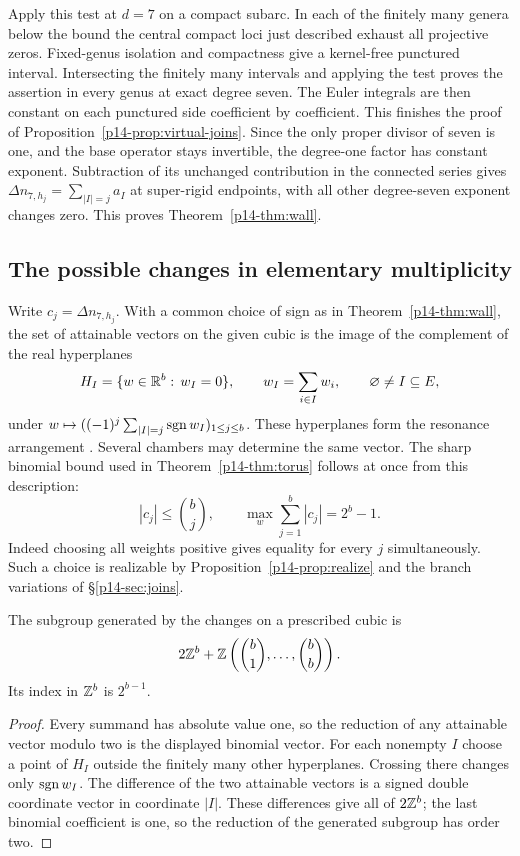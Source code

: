 Apply this test at $d=7$ on a compact subarc. In each of the finitely
many genera below the bound the central compact loci just described
exhaust all projective zeros. Fixed-genus isolation and compactness
give a kernel-free punctured interval. Intersecting the finitely many
intervals and applying the test proves the assertion in every genus
at exact degree seven. The Euler integrals are then constant on each
punctured side coefficient by coefficient. This finishes the proof of
Proposition~\ref{p14-prop:virtual-joins}. Since the only proper divisor
of seven is one, and the base operator stays invertible, the
degree-one factor has constant exponent. Subtraction of its unchanged
contribution in the connected series gives
$\Delta n_{7,h_j}=\sum_{|I|=j}a_I$ at super-rigid endpoints, with
all other degree-seven exponent changes zero. This proves Theorem~\ref{p14-thm:wall}.
\subsection{The possible changes in elementary multiplicity}\label{p14-sec:chambers}
Write \(c_j=\Delta n_{7,h_j}\). With a common choice of sign as in
Theorem~\ref{p14-thm:wall}, the set of attainable vectors on the given cubic
is the image of the complement of the real hyperplanes
\[
       H_I=\{w\in\mathbb R^b:\, w_I=0\},\qquad
       w_I=\sum_{i\in I}w_i,\qquad \varnothing\ne I\subseteq E ,
\]
under \(w\mapsto ((-1)^j\sum_{|I|=j}\operatorname{sgn} w_I)_{1\leq j\leq b}\).
These hyperplanes form the resonance arrangement \cite{kuehne}. Several
chambers may determine the same vector. The sharp binomial bound used
in Theorem~\ref{p14-thm:torus} follows at once from this description:
\[
       |c_j|\leq\binom bj,\qquad
       \max_{w}\sum_{j=1}^{b}|c_j|=2^b-1 .
\]
Indeed choosing all weights positive gives equality for every \(j\)
simultaneously. Such a choice is realizable by
Proposition~\ref{p14-prop:realize} and the branch variations of
\S\ref{p14-sec:joins}.

\begin{proposition}\label{p14-prop:lattice}
The subgroup generated by the changes on a prescribed cubic is
\[
       2\mathbb Z^b+\mathbb Z\left(\binom b1,\ldots,\binom bb\right).
\]
Its index in \(\mathbb Z^b\) is \(2^{b-1}\).
\end{proposition}
\begin{proof}
Every summand has absolute value one, so the reduction of any
attainable vector modulo two is the displayed binomial vector.
For each nonempty \(I\) choose a point of \(H_I\) outside the finitely
many other hyperplanes. Crossing there changes only \(\operatorname{sgn} w_I\).
The difference of the two attainable vectors is a signed double
coordinate vector in coordinate \(|I|\). These differences give all of
\(2\mathbb Z^b\); the last binomial coefficient is one, so the reduction
of the generated subgroup has order two.
\end{proof}

